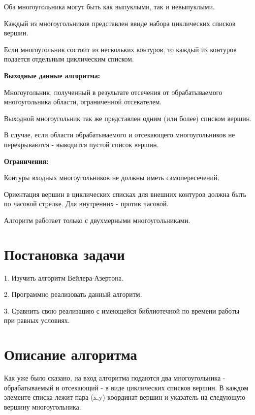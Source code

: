 \documentclass[12pt]{article}
\begin{document}
Оба многоугольника могут быть как выпуклыми, так и невыпуклыми.

Каждый из многоугольников представлен ввиде набора циклических списков вершин.


Если многоугольник состоит из нескольких контуров, то каждый из контуров подается отдельным циклическим списком. 

{ \bf Выходные данные алгоритма:}

Многоугольник, полученный в результате отсечения от обрабатываемого многоугольника области, ограниченной отсекателем.

Выходной многоугольник так же представлен одним (или более) списком вершин.

В случае, если области обрабатываемого и отсекающего многоугольников не перекрываются - выводится пустой список вершин.

{ \bf Ограничения:}

Контуры входных многоугольников не должны иметь самопересечений.

Ориентация вершин в циклических списках для внешних контуров должна быть по часовой стрелке.
Для внутренних - против часовой.

Алгоритм работает только с двухмерными многоугольниками.






\newpage
\section{Постановка задачи}

1. Изучить алгоритм Вейлера-Азертона.

2. Программно реализовать данный алгоритм.

3. Сравнить свою реализацию с имеющейся библиотечной по времени работы  при равных условиях.

\newpage



\section{Описание алгоритма}


Как уже было сказано, на вход алгоритма подаются два многоугольника - обрабатываемый и отсекающий - в виде циклических списков вершин.  В каждом элементе списка лежит пара (x,y)  координат вершин и указатель на следующую вершину многоугольника.
\end{document}
